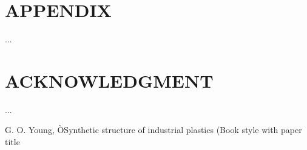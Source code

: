 \documentclass[letterpaper, 10 pt, conference]{ieeeconf}  %
\begin{document}






\section*{APPENDIX}

...

\section*{ACKNOWLEDGMENT}

...

\begin{thebibliography}{99}

 G. O. Young, ÒSynthetic structure of industrial plastics (Book style with paper title 

\end{thebibliography}
\end{document}
